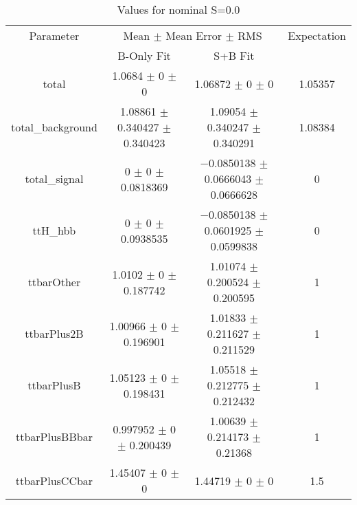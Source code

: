 \begin{table}
\centering
\caption{Values for nominal S=0.0}
\begin{tabular}{cccc}
\toprule
Parameter & \multicolumn{2}{c}{Mean $\pm$ Mean Error $\pm$ RMS} & Expectation\\
 & B-Only Fit & S+B Fit & \\
\midrule
total & \num{1.0684} $\pm$ \num{0} $\pm$ \num{0} & \num{1.06872} $\pm$ \num{0} $\pm$ \num{0} & \num{1.05357}\\
total\_background & \num{1.08861} $\pm$ \num{0.340427} $\pm$ \num{0.340423} & \num{1.09054} $\pm$ \num{0.340247} $\pm$ \num{0.340291} & \num{1.08384}\\
total\_signal & \num{0} $\pm$ \num{0} $\pm$ \num{0.0818369} & \num{-0.0850138} $\pm$ \num{0.0666043} $\pm$ \num{0.0666628} & \num{0}\\
ttH\_hbb & \num{0} $\pm$ \num{0} $\pm$ \num{0.0938535} & \num{-0.0850138} $\pm$ \num{0.0601925} $\pm$ \num{0.0599838} & \num{0}\\
ttbarOther & \num{1.0102} $\pm$ \num{0} $\pm$ \num{0.187742} & \num{1.01074} $\pm$ \num{0.200524} $\pm$ \num{0.200595} & \num{1}\\
ttbarPlus2B & \num{1.00966} $\pm$ \num{0} $\pm$ \num{0.196901} & \num{1.01833} $\pm$ \num{0.211627} $\pm$ \num{0.211529} & \num{1}\\
ttbarPlusB & \num{1.05123} $\pm$ \num{0} $\pm$ \num{0.198431} & \num{1.05518} $\pm$ \num{0.212775} $\pm$ \num{0.212432} & \num{1}\\
ttbarPlusBBbar & \num{0.997952} $\pm$ \num{0} $\pm$ \num{0.200439} & \num{1.00639} $\pm$ \num{0.214173} $\pm$ \num{0.21368} & \num{1}\\
ttbarPlusCCbar & \num{1.45407} $\pm$ \num{0} $\pm$ \num{0} & \num{1.44719} $\pm$ \num{0} $\pm$ \num{0} & \num{1.5}\\
\bottomrule
\end{tabular}
\end{table}